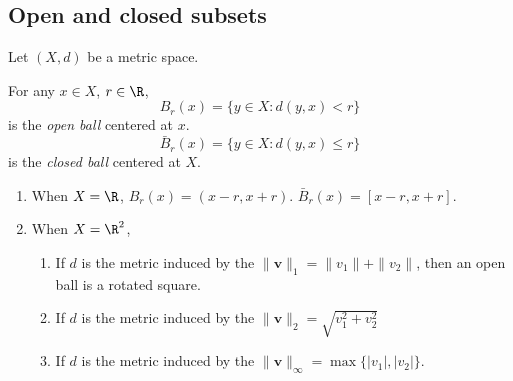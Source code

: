 \documentclass[a4paper]{article}
\begin{document}
\subsection{Open and closed subsets}
Let $(X, d)$ be a metric space.
\begin{defi}[Balls]
  For any $x\in X$, $r\in \R$,
  \[
    B_r(x) = \{y\in X: d(y, x) < r\}
  \]
  is the \emph{open ball} centered at $x$.
  \[
    \bar{B}_r(x) = \{y\in X: d(y, x) \leq r\}
  \]
  is the \emph{closed ball} centered at $X$.
\end{defi}

\begin{eg}\leavevmode
  \begin{enumerate}
    \item When $X = \R$, $B_r(x) = (x - r, x + r)$. $\bar{B}_r(x) = [x - r, x + r]$.
    \item When $X = \R^2$,
      \begin{enumerate}
        \item If $d$ is the metric induced by the $\|\mathbf{v}\|_1 = \|v_1\| + \|v_2\|$, then an open ball is a rotated square.
          \begin{center}
          \end{center}
        \item If $d$ is the metric induced by the $\|\mathbf{v}\|_2 = \sqrt{v_1^2 + v_2^2}$
          \begin{center}
          \end{center}

        \item If $d$ is the metric induced by the $\|\mathbf{v}\|_\infty = \max\{|v_1|, |v_2|\}$.
          \begin{center}
          \end{center}
      \end{enumerate}
  \end{enumerate}
\end{eg}
\end{document}
